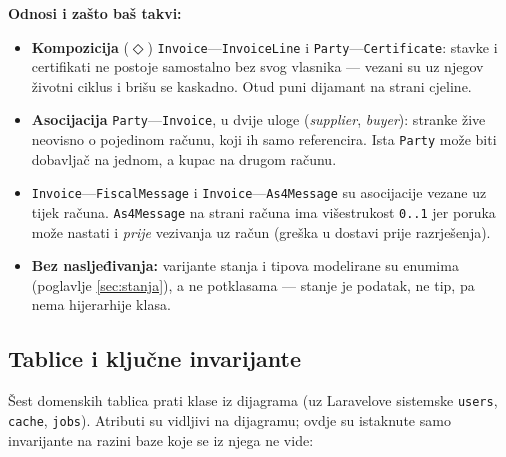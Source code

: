 \documentclass[11pt,a4paper]{article}
\begin{document}
\textbf{Odnosi i zašto baš takvi:}
\begin{itemize}[nosep]
  \item \textbf{Kompozicija} ($\Diamond$) \texttt{Invoice}—\texttt{InvoiceLine} i \texttt{Party}—\texttt{Certificate}:
        stavke i certifikati ne postoje samostalno bez svog vlasnika — vezani su uz njegov
        životni ciklus i brišu se kaskadno. Otud puni dijamant na strani cjeline.
  \item \textbf{Asocijacija} \texttt{Party}—\texttt{Invoice}, u dvije uloge
        (\emph{supplier}, \emph{buyer}): stranke žive neovisno o pojedinom računu, koji ih samo
        referencira. Ista \texttt{Party} može biti dobavljač na jednom, a kupac na drugom računu.
  \item \texttt{Invoice}—\texttt{FiscalMessage} i \texttt{Invoice}—\texttt{As4Message} su asocijacije
        vezane uz tijek računa. \texttt{As4Message} na strani računa ima višestrukost \texttt{0..1}
        jer poruka može nastati i \emph{prije} vezivanja uz račun (greška u dostavi prije razrješenja).
  \item \textbf{Bez nasljeđivanja:} varijante stanja i tipova modelirane su enumima
        (poglavlje \ref{sec:stanja}), a ne potklasama — stanje je podatak, ne tip, pa nema hijerarhije klasa.
\end{itemize}

\subsection{Tablice i ključne invarijante}

Šest domenskih tablica prati klase iz dijagrama (uz Laravelove sistemske \texttt{users},
\texttt{cache}, \texttt{jobs}). Atributi su vidljivi na dijagramu; ovdje su istaknute samo
invarijante na razini baze koje se iz njega ne vide:
\end{document}
